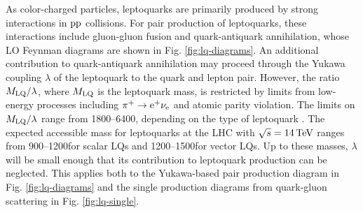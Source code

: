 As color-charged particles, leptoquarks are primarily produced by strong interactions in $\mathrm{p}\mathrm{p}$ collisions. For pair production of leptoquarks, these interactions include gluon-gluon fusion and quark-antiquark annihilation, whose LO Feynman diagrams are shown in Fig. \ref{fig:lq-diagrams}. An additional contribution to quark-antiquark annihilation may proceed through the Yukawa coupling $\lambda$ of the leptoquark to the quark and lepton pair. However, the ratio $M_{\text{LQ}}/\lambda$, where $M_{\text{LQ}}$ is the leptoquark mass, is restricted by limits from low-energy processes including $\pi^{+} \rightarrow \mathrm{e}^{+} \nu_{\mathrm{e}}$ and atomic parity violation. The limits on $M_{\text{LQ}}/\lambda$ range from 1800--6400\GeVcc, depending on the type of leptoquark \cite{Leurer:1993em, MuchAdo, LQreview}. The expected accessible mass for leptoquarks at the LHC with $\sqrt{s}=14\,\text{Te\hspace{-.08em}V}$ ranges from 900--1200\GeVcc for scalar LQs and 1200--1500\GeVcc for vector LQs\cite{LQPairHad}. Up to these masses, $\lambda$ will be small enough that its contribution to leptoquark production can be neglected. This applies both to the Yukawa-based pair production diagram in Fig. \ref{fig:lq-diagrams} and the single production diagrams from quark-gluon scattering in Fig. \ref{fig:lq-single}.

